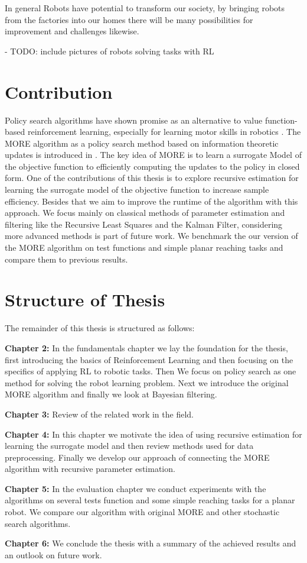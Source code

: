 In general Robots have potential to transform our society, by
bringing robots from the factories into our homes there will be many
possibilities for improvement and challenges likewise.

- TODO: include pictures of robots solving tasks with RL


\section{Contribution}
Policy search algorithms have shown promise as an alternative
to value function-based reinforcement learning, especially for learning motor
skills in robotics \citet{deisenroth2013survey}.
The MORE algorithm as a policy search method based on
information theoretic updates is introduced in \citet{abdolmaleki2015model}.
The key idea of MORE is to learn a surrogate Model of
the objective function to efficiently computing the updates to
the policy in closed form. One of
the contributions of this thesis is to explore recursive estimation 
for learning the surrogate model of the objective function to increase
sample efficiency. Besides that we aim to improve the  runtime of
the algorithm with this approach.
We focus mainly on classical methods of parameter estimation and filtering
like the Recursive Least Squares and the Kalman Filter,
considering more advanced methods is part of future work.
We benchmark the our version of the MORE algorithm on test functions and
simple planar reaching tasks and compare
them to previous results.

\section{Structure of Thesis}
The remainder of this thesis is structured as follows:

\textbf{Chapter 2:} In the fundamentals chapter we lay the foundation for
the thesis, first introducing the basics of Reinforcement Learning and
then focusing on the specifics of applying RL to robotic tasks.
Then We focus on policy search as one method for
solving the robot learning problem.
Next we introduce the original MORE algorithm and finally
we look at Bayesian filtering.

\textbf{Chapter 3:} Review of the related work in the field.

\textbf{Chapter 4:} In this chapter we motivate the idea of
using recursive estimation for learning the surrogate model
and then review methods used for data preprocessing.
Finally we develop our approach of  connecting
the MORE algorithm with recursive parameter estimation. 

\textbf{Chapter 5:} In the evaluation chapter we conduct experiments
with the algorithms on several tests function and some simple reaching tasks
for a planar robot. We compare our algorithm with original MORE and
other stochastic search algorithms.

\textbf{Chapter 6:} We conclude the thesis with a summary of
the achieved results and an outlook on future work.